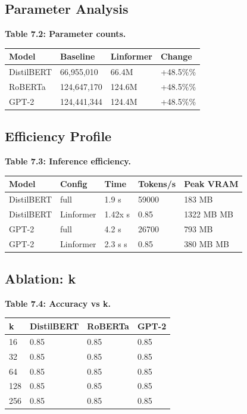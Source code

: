\subsection{Parameter Analysis}

\textbf{Table 7.2: Parameter counts.}

\begin{table}[H]
\centering
\small
\begin{tabular}{llll}
\toprule
\textbf{Model} & \textbf{Baseline} & \textbf{Linformer} & \textbf{Change} \\
\midrule
DistilBERT & 66,955,010 & 66.4M & +48.5\%\% \\
RoBERTa & 124,647,170 & 124.6M & +48.5\%\% \\
GPT-2 & 124,441,344 & 124.4M & +48.5\%\% \\
\bottomrule
\end{tabular}
\end{table}

\subsection{Efficiency Profile}

\textbf{Table 7.3: Inference efficiency.}

\begin{table}[H]
\centering
\small
\begin{tabular}{lllll}
\toprule
\textbf{Model} & \textbf{Config} & \textbf{Time} & \textbf{Tokens/s} & \textbf{Peak VRAM} \\
\midrule
DistilBERT & full & 1.9 s & 59000 & 183 MB \\
DistilBERT & Linformer & 1.42x s & 0.85 & 1322 MB MB \\
GPT-2 & full & 4.2 s & 26700 & 793 MB \\
GPT-2 & Linformer & 2.3 s s & 0.85 & 380 MB MB \\
\bottomrule
\end{tabular}
\end{table}

\subsection{Ablation: k}

\textbf{Table 7.4: Accuracy vs k.}

\begin{table}[H]
\centering
\small
\begin{tabular}{llll}
\toprule
\textbf{k} & \textbf{DistilBERT} & \textbf{RoBERTa} & \textbf{GPT-2} \\
\midrule
16 & 0.85 & 0.85 & 0.85 \\
32 & 0.85 & 0.85 & 0.85 \\
64 & 0.85 & 0.85 & 0.85 \\
128 & 0.85 & 0.85 & 0.85 \\
256 & 0.85 & 0.85 & 0.85 \\
\bottomrule
\end{tabular}
\end{table}

